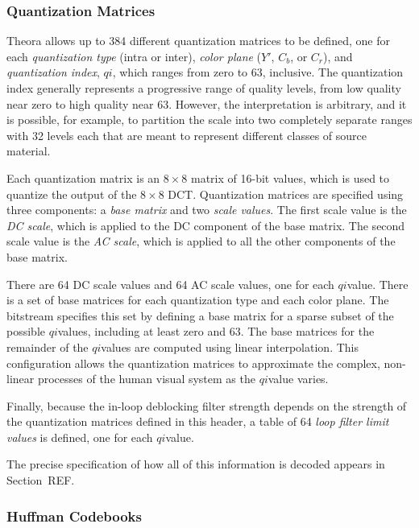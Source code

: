 \documentclass[11pt,letterpaper]{article}
\newcommand{\qi}{\ensuremath{\mathit{qi}}}
\newcommand{\term}[1]{{\em #1}}
\begin{document}
\subsubsection{Quantization Matrices}

Theora allows up to 384 different quantization matrices to be defined, one for
 each \term{quantization type} (intra or inter), \term{color plane}
 ($Y'$, $C_b$, or $C_r$), and \term{quantization index}, \qi, which ranges from
 zero to 63, inclusive.
The quantization index generally represents a progressive range of quality
 levels, from low quality near zero to high quality near 63.
However, the interpretation is arbitrary, and it is possible, for example, to
 partition the scale into two completely separate ranges with 32 levels each
 that are meant to represent different classes of source material.

Each quantization matrix is an $8\times 8$ matrix of 16-bit values, which is
 used to quantize the output of the $8\times 8$ DCT.
Quantization matrices are specified using three components: a
 \term{base matrix} and two \term{scale values}.
The first scale value is the \term{DC scale}, which is applied to the DC
 component of the base matrix.
The second scale value is the \term{AC scale}, which is applied to all the
 other components of the base matrix.

There are 64 DC scale values and 64 AC scale values, one for each \qi value.
There is a set of base matrices for each quantization type and each color
 plane.
The bitstream specifies this set by defining a base matrix for a sparse subset
 of the possible \qi values, including at least zero and 63.
The base matrices for the remainder of the \qi values are computed using linear
 interpolation.
This configuration allows the quantization matrices to approximate the complex,
 non-linear processes of the human visual system as the \qi value varies.

Finally, because the in-loop deblocking filter strength depends on the strength
 of the quantization matrices defined in this header, a table of 64 \term{loop
 filter limit values} is defined, one for each \qi value.

The precise specification of how all of this information is decoded appears in
 Section~REF.

\subsubsection{Huffman Codebooks}
\end{document}
